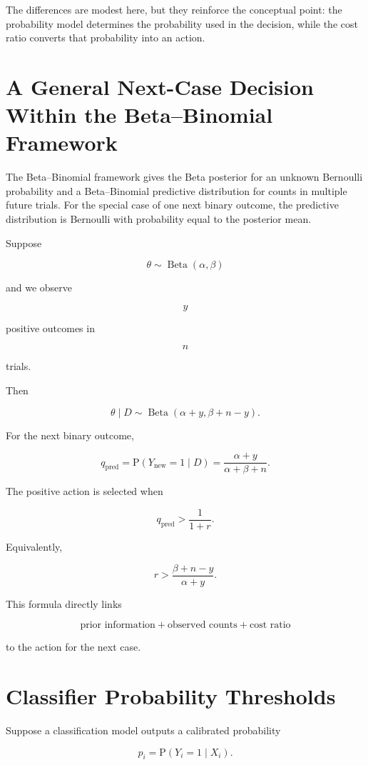 \documentclass[11pt]{article}
\newcommand{\Prob}{\mathrm{P}}
\begin{document}
The differences are modest here, but they reinforce the conceptual point: the probability model determines the probability used in the decision, while the cost ratio converts that probability into an action.

\section{A General Next-Case Decision Within the Beta--Binomial Framework}

The Beta--Binomial framework gives the Beta posterior for an unknown Bernoulli probability and a Beta--Binomial predictive distribution for counts in multiple future trials. For the special case of one next binary outcome, the predictive distribution is Bernoulli with probability equal to the posterior mean.

Suppose

\[
\theta\sim\operatorname{Beta}(\alpha,\beta)
\]

and we observe

\[
y
\]

positive outcomes in

\[
n
\]

trials.

Then

\[
\theta\mid D
\sim
\operatorname{Beta}
(\alpha+y,\beta+n-y).
\]

For the next binary outcome,

\[
q_{\mathrm{pred}}
=
\Prob(Y_{\mathrm{new}}=1\mid D)
=
\frac{\alpha+y}{\alpha+\beta+n}.
\]

The positive action is selected when

\[
q_{\mathrm{pred}}
>
\frac{1}{1+r}.
\]

Equivalently,

\[
\boxed{
r
>
\frac{\beta+n-y}{\alpha+y}.
}
\]

This formula directly links

\[
\boxed{
\text{prior information}
+
\text{observed counts}
+
\text{cost ratio}
}
\]

to the action for the next case.

\section{Classifier Probability Thresholds}

Suppose a classification model outputs a calibrated probability

\[
p_i
=
\Prob(Y_i=1\mid X_i).
\]
\end{document}
